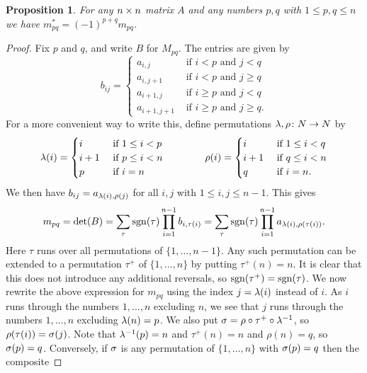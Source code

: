 \documentclass[reqno]{amsart}
\newtheorem{proposition}[theorem]{Proposition}
\theoremstyle{definition}
\begin{document}
\begin{proposition}\label{prop-minors}
 For any $n\times n$ matrix $A$ and any numbers $p,q$ with
 $1\leq p,q\leq n$ we have $m^*_{pq}=(-1)^{p+q}m_{pq}$.
\end{proposition}
\begin{proof}
 Fix $p$ and $q$, and write $B$ for $M_{pq}$.  The entries are given
 by
 \[ b_{ij} =
     \begin{cases}
      a_{i,j}     & \text{ if } i<p \text{ and } j < q \\
      a_{i,j+1}   & \text{ if } i<p \text{ and } j \geq q \\
      a_{i+1,j}   & \text{ if } i\geq p \text{ and } j < q \\
      a_{i+1,j+1} & \text{ if } i\geq p \text{ and } j \geq q.
     \end{cases}
 \]
 For a more convenient way to write this, define permutations
 $\lambda,\rho\colon N\to N$ by
 \[ \lambda(i) = \begin{cases}
      i   & \text{ if } 1\leq i<p \\
      i+1 & \text{ if } p\leq i<n \\
      p   & \text{ if } i=n
     \end{cases}
     \hspace{4em}
    \rho(i) = \begin{cases}
      i   & \text{ if } 1\leq i<q \\
      i+1 & \text{ if } q\leq i<n \\
      q   & \text{ if } i=n.
     \end{cases}
 \]
 We then have $b_{ij}=a_{\lambda(i),\rho(j)}$ for all $i,j$ with
 $1\leq i,j\leq n-1$.  This gives
 \[ m_{pq} = \det(B)
     = \sum_\tau \operatorname{sgn}(\tau)\prod_{i=1}^{n-1}b_{i,\tau(i)}
     = \sum_\tau \operatorname{sgn}(\tau)\prod_{i=1}^{n-1}a_{\lambda(i),\rho(\tau(i))}.
 \]
 Here $\tau$ runs over all permutations of $\{1,\dotsc,n-1\}$.  Any
 such permutation can be extended to a permutation $\tau^+$ of
 $\{1,\dotsc,n\}$ by putting $\tau^+(n)=n$.  It is clear that this
 does not introduce any additional reversals, so
 $\operatorname{sgn}(\tau^+)=\operatorname{sgn}(\tau)$.  We now rewrite the above expression for
 $m_{pq}$ using the index $j=\lambda(i)$ instead of $i$.  As $i$ runs
 through the numbers $1,\dotsc,n$ excluding $n$, we see that $j$ runs
 through the numbers $1,\dotsc,n$ excluding $\lambda(n)=p$.  We also put
 $\sigma=\rho\circ\tau^+\circ\lambda^{-1}$, so $\rho(\tau(i))=\sigma(j)$.  Note
 that $\lambda^{-1}(p)=n$ and $\tau^+(n)=n$ and $\rho(n)=q$, so
 $\sigma(p)=q$.  Conversely, if $\sigma$ is any permutation of
 $\{1,\dotsc,n\}$ with $\sigma(p)=q$ then the composite

\end{proof}
\end{document}
